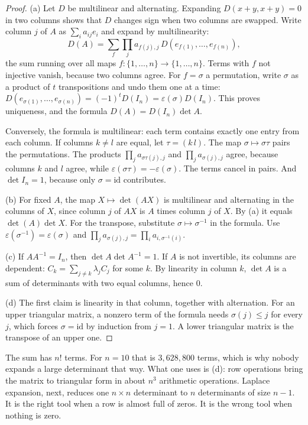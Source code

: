 \begin{proof}
(a) Let $D$ be multilinear and alternating. Expanding $D(x+y,x+y)=0$ in two columns shows that $D$ changes sign when two columns are swapped. Write column $j$ of $A$ as $\sum_ia_{ij}e_i$ and expand by multilinearity:
\[
D(A)=\sum_{f}\prod_ja_{f(j),j}\,D(e_{f(1)},\dots,e_{f(n)}),
\]
the sum running over all maps $f:\{1,\dots,n\}\to\{1,\dots,n\}$. Terms with $f$ not injective vanish, because two columns agree. For $f=\sigma$ a permutation, write $\sigma$ as a product of $t$ transpositions and undo them one at a time: $D(e_{\sigma(1)},\dots,e_{\sigma(n)})=(-1)^tD(I_n)=\varepsilon(\sigma)D(I_n)$. This proves uniqueness, and the formula $D(A)=D(I_n)\det A$.

Conversely, the formula is multilinear: each term contains exactly one entry from each column. If columns $k\ne l$ are equal, let $\tau=(k\,l)$. The map $\sigma\mapsto\sigma\tau$ pairs the permutations. The products $\prod_ja_{\sigma\tau(j),j}$ and $\prod_ja_{\sigma(j),j}$ agree, because columns $k$ and $l$ agree, while $\varepsilon(\sigma\tau)=-\varepsilon(\sigma)$. The terms cancel in pairs. And $\det I_n=1$, because only $\sigma=\mathrm{id}$ contributes.

(b) For fixed $A$, the map $X\mapsto\det(AX)$ is multilinear and alternating in the columns of $X$, since column $j$ of $AX$ is $A$ times column $j$ of $X$. By (a) it equals $\det(A)\det X$. For the transpose, substitute $\sigma\mapsto\sigma^{-1}$ in the formula. Use $\varepsilon(\sigma^{-1})=\varepsilon(\sigma)$ and $\prod_ja_{\sigma(j),j}=\prod_ia_{i,\sigma^{-1}(i)}$.

(c) If $AA^{-1}=I_n$, then $\det A\det A^{-1}=1$. If $A$ is not invertible, its columns are dependent: $C_k=\sum_{j\ne k}\lambda_jC_j$ for some $k$. By linearity in column $k$, $\det A$ is a sum of determinants with two equal columns, hence $0$.

(d) The first claim is linearity in that column, together with alternation. For an upper triangular matrix, a nonzero term of the formula needs $\sigma(j)\le j$ for every $j$, which forces $\sigma=\mathrm{id}$ by induction from $j=1$. A lower triangular matrix is the transpose of an upper one.
\end{proof}

The sum has $n!$ terms. For $n=10$ that is $3{,}628{,}800$ terms, which is why nobody expands a large determinant that way. What one uses is (d): row operations bring the matrix to triangular form in about $n^3$ arithmetic operations. Laplace expansion, next, reduces one $n\times n$ determinant to $n$ determinants of size $n-1$. It is the right tool when a row is almost full of zeros. It is the wrong tool when nothing is zero.

